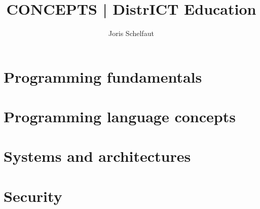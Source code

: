 \documentclass[a4paper,twoside,10pt]{book}
\title{CONCEPTS | DistrICT Education}
\author{Joris Schelfaut}
\date{}
\begin{document}
\maketitle

\cleardoublepage %
\pagestyle{plain} %


\rmfamily
\setcounter{page}{0}





\pagestyle{empty} %
\tableofcontents %

\setcounter{page}{0}


\part{Programming fundamentals}\label{part:programming-fundamentals}





\part{Programming language concepts}\label{part:programming-language-concepts}





\part{Systems and architectures}\label{part:systems-and-architectures}




\part{Security}\label{part:security}




\end{document}
